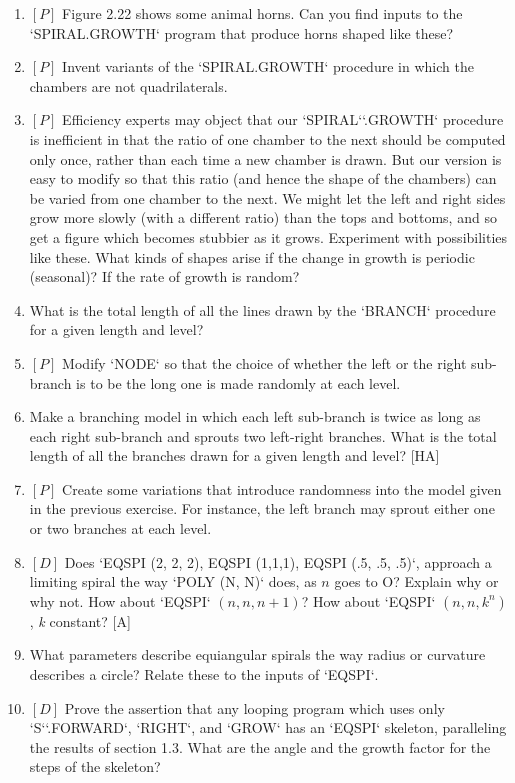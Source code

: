 \documentclass{book}
\begin{document}
\begin{enumerate}
\item $[P]$ Figure 2.22 shows some animal horns. Can you find inputs to the
\textsc{`SPIRAL.GROWTH`} program that produce horns shaped like these?
\item $[P]$ Invent variants of the \textsc{`SPIRAL.GROWTH`} procedure in which the
chambers are not quadrilaterals.
\item $[P]$ Efficiency experts may object that our \textsc{`SPIRAL`}\textsc{`.GROWTH`} procedure
is inefficient in that the ratio of one chamber to the next should be
computed only once, rather than each time a new chamber is drawn.
But our version is easy to modify so that this ratio (and hence the shape
of the chambers) can be varied from one chamber to the next. We might
let the left and right sides grow more slowly (with a different ratio) than
the tops and bottoms, and so get a figure which becomes stubbier as it
grows. Experiment with possibilities like these. What kinds of shapes
arise if the change in growth is periodic (seasonal)? If the rate of growth
is random?
\item What is the total length of all the lines drawn by the \textsc{`BRANCH`} procedure
for a given length and level?  
\item $[P]$ Modify \textsc{`NODE`} so that the choice of whether the left or the right
sub-branch is to be the long one is made randomly at each level.
\item Make a branching model in which each left sub-branch is twice as
long as each right sub-branch and sprouts two left-right branches. What
is the total length of all the branches drawn for a given length and level?
[HA]
\item $[P]$ Create some variations that introduce randomness into the model
given in the previous exercise. For instance, the left branch may sprout
either one or two branches at each level.
\item $[D]$ Does \textsc{`EQSPI (2, 2, 2), EQSPI (1,1,1), EQSPI (.5, .5, .5)`},   approach
a limiting spiral the way \textsc{`POLY (N, N)`} does, as $n$ goes to O? Explain why
or why not. How about \textsc{`EQSPI`} $(n, n, n + 1)$? How about \textsc{`EQSPI`} $(n, n, k^{n})$,
{\em k} constant? [A]
\item What parameters describe equiangular spirals the way radius or
curvature describes a circle? Relate these to the inputs of \textsc{`EQSPI`}.  
\item $[D]$ Prove the assertion that any looping program which uses only
\textsc{`S`}\textsc{`.FORWARD`}, \textsc{`RIGHT`}, and \textsc{`GROW`} has an \textsc{`EQSPI`} skeleton, paralleling the
results of section 1.3. What are the angle and the growth factor for
the steps of the skeleton?  

\end{enumerate}
\end{document}
